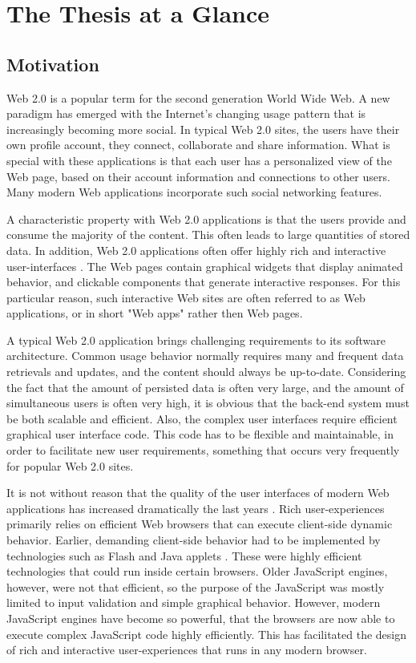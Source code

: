 \chapter{The Thesis at a Glance}     %
\section{Motivation}
Web 2.0 is a popular term for the second generation World Wide Web. A new paradigm has emerged with the Internet's changing usage pattern that is increasingly becoming more social\cite{oreilly2007web}. In typical Web 2.0 sites, the users have their own profile account, they connect, collaborate and share information. What is special with these applications is that each user has a personalized view of the Web page, based on their account information and connections to other users. Many modern Web applications incorporate such social networking features.
                
A characteristic property with Web 2.0 applications is that the users provide and consume the majority of the content. This often leads to large quantities of stored data. In addition, Web 2.0 applications often offer highly rich and interactive user-interfaces \cite[p.~158]{web20book}. The Web pages contain graphical widgets that display animated behavior, and clickable components that generate interactive responses. For this particular reason, such interactive Web sites are often referred to as Web applications, or in short "Web apps" rather then Web pages\cite{web-apps}.
                
A typical Web 2.0 application brings challenging requirements to its software architecture. Common usage behavior normally requires many and frequent data retrievals and updates, and the content should always be up-to-date. Considering the fact that the amount of persisted data is often very large, and the amount of simultaneous users is often very high, it is obvious that the back-end system must be both scalable and efficient. Also, the complex user interfaces require efficient graphical user interface code. This code has to be flexible and maintainable, in order to facilitate new user requirements, something that occurs very frequently for popular Web 2.0 sites\cite{userreq}. %

It is not without reason that the quality of the user interfaces of modern Web applications has increased dramatically the last years \cite{JsWebApps}. Rich user-experiences primarily relies on efficient Web browsers that can execute client-side dynamic behavior. Earlier, demanding client-side behavior had to be implemented by technologies such as Flash\cite{flash} and Java applets \cite[p.~4]{spa}. These were highly efficient technologies that could run inside certain browsers. Older JavaScript engines, however, were not that efficient, so the purpose of the JavaScript was mostly limited to input validation and simple graphical behavior. However, modern JavaScript engines have become so powerful, that the browsers are now able to execute complex JavaScript code highly efficiently. This has facilitated the design of rich and interactive user-experiences that runs in any modern browser.

